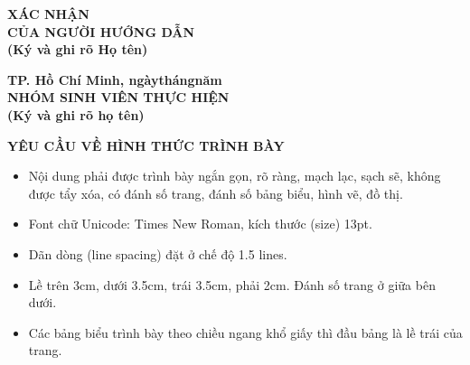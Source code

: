 \documentclass[12pt,a4paper]{article}
\begin{document}
\vspace{1.5\baselineskip}

\noindent
\begin{minipage}[t]{0.48\textwidth}
  \centering
  \textbf{XÁC NHẬN}\\
  \textbf{CỦA NGƯỜI HƯỚNG DẪN}\\
  \textbf{(Ký và ghi rõ Họ tên)}
\end{minipage}\hfill
\begin{minipage}[t]{0.48\textwidth}
  \centering
  \textbf{TP. Hồ Chí Minh, ngày\hspace{1cm}tháng\hspace{1cm}năm}\\
  \textbf{NHÓM SINH VIÊN THỰC HIỆN}\\
  \textbf{(Ký và ghi rõ họ tên)}
\end{minipage}

\vspace{7\baselineskip}

\newpage

\begin{center}
  \textbf{YÊU CẦU VỀ HÌNH THỨC TRÌNH BÀY}
\end{center}

\begin{itemize}[label=\textbullet,leftmargin=2em,itemsep=0.2\baselineskip,topsep=0.2\baselineskip]
  \item Nội dung phải được trình bày ngắn gọn, rõ ràng, mạch lạc, sạch sẽ, không được tẩy xóa, có đánh số trang, đánh số bảng biểu, hình vẽ, đồ thị.
  \item Font chữ Unicode: Times New Roman, kích thước (size) 13pt.
  \item Dãn dòng (line spacing) đặt ở chế độ 1.5 lines.
  \item Lề trên 3cm, dưới 3.5cm, trái 3.5cm, phải 2cm. Đánh số trang ở giữa bên dưới.
  \item Các bảng biểu trình bày theo chiều ngang khổ giấy thì đầu bảng là lề trái của trang.
\end{itemize}
\end{document}
